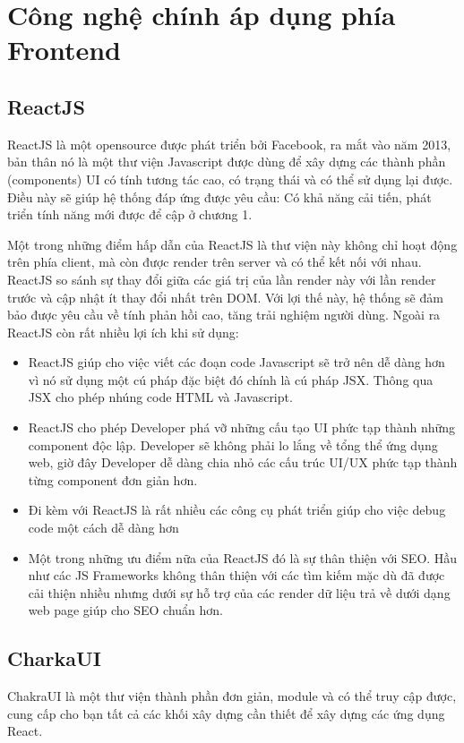 \documentclass[../DoAn.tex]{subfiles}
\begin{document}
\section{Công nghệ chính áp dụng phía Frontend}
\subsection{ReactJS}
ReactJS\cite{reactjs} là một opensource được phát triển bởi Facebook, ra mắt vào năm 2013, bản thân nó là một thư viện Javascript được dùng để xây dựng các thành phần (components) UI có tính tương tác cao, có trạng thái và có thể sử dụng lại được. Điều này sẽ giúp hệ thống đáp ứng được yêu cầu: Có khả năng cải tiến, phát triển tính năng mới được để cập ở chương 1.

Một trong những điểm hấp dẫn của ReactJS là thư viện này không chỉ hoạt động trên phía client, mà còn được render trên server và có thể kết nối với nhau. ReactJS so sánh sự thay đổi giữa các giá trị của lần render này với lần render trước và cập nhật ít thay đổi nhất trên DOM. Với lợi thế này, hệ thống sẽ đảm bảo được yêu cầu về tính phản hồi cao, tăng trải nghiệm người dùng. Ngoài ra ReactJS còn rất nhiều lợi ích khi sử dụng:
\begin{itemize}
    \item ReactJS giúp cho việc viết các đoạn code Javascript sẽ trở nên dễ dàng hơn vì nó sử dụng một cú pháp đặc biệt đó chính là cú pháp JSX. Thông qua JSX cho phép nhúng code HTML và Javascript.
    \item ReactJS cho phép Developer phá vỡ những cấu tạo UI phức tạp thành những component độc lập. Developer sẽ không phải lo lắng về tổng thể ứng dụng web, giờ đây Developer dễ dàng chia nhỏ các cấu trúc UI/UX phức tạp thành từng component đơn giản hơn.
    \item Đi kèm với ReactJS là rất nhiều các công cụ phát triển giúp cho việc debug code một cách dễ dàng hơn 
    \item Một trong những ưu điểm nữa của ReactJS đó là sự thân thiện với SEO. Hầu như các JS Frameworks không thân thiện với các tìm kiếm mặc dù đã được cải thiện nhiều nhưng dưới sự hỗ trợ của các render dữ liệu trả về dưới dạng web page giúp cho SEO chuẩn hơn.
\end{itemize}
\subsection{CharkaUI}
 ChakraUI\cite{chakra} là một thư viện thành phần đơn giản, module và có thể truy cập được, cung cấp cho bạn tất cả các khối xây dựng cần thiết để xây dựng các ứng dụng React.
\end{document}
